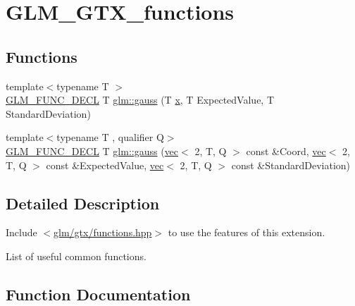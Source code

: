 \hypertarget{group__gtx__functions}{}\section{G\+L\+M\+\_\+\+G\+T\+X\+\_\+functions}
\label{group__gtx__functions}
\subsection*{Functions}
\begin{DoxyCompactItemize}
\item 
{\footnotesize template$<$typename T $>$ }\\\hyperlink{setup_8hpp_ab2d052de21a70539923e9bcbf6e83a51}{G\+L\+M\+\_\+\+F\+U\+N\+C\+\_\+\+D\+E\+CL} T \hyperlink{group__gtx__functions_ga0b50b197ff74261a0fad90f4b8d24702}{glm\+::gauss} (T \hyperlink{_s_d_l__opengl_8h_ad0e63d0edcdbd3d79554076bf309fd47}{x}, T Expected\+Value, T Standard\+Deviation)
\item 
{\footnotesize template$<$typename T , qualifier Q$>$ }\\\hyperlink{setup_8hpp_ab2d052de21a70539923e9bcbf6e83a51}{G\+L\+M\+\_\+\+F\+U\+N\+C\+\_\+\+D\+E\+CL} T \hyperlink{group__gtx__functions_gad19ec8754a83c0b9a8dc16b7e60705ab}{glm\+::gauss} (\hyperlink{structglm_1_1vec}{vec}$<$ 2, T, Q $>$ const \&Coord, \hyperlink{structglm_1_1vec}{vec}$<$ 2, T, Q $>$ const \&Expected\+Value, \hyperlink{structglm_1_1vec}{vec}$<$ 2, T, Q $>$ const \&Standard\+Deviation)
\end{DoxyCompactItemize}


\subsection{Detailed Description}
Include $<$\hyperlink{functions_8hpp}{glm/gtx/functions.\+hpp}$>$ to use the features of this extension.

List of useful common functions. 

\subsection{Function Documentation}
\mbox{\label{group__gtx__functions_ga0b50b197ff74261a0fad90f4b8d24702}} 
